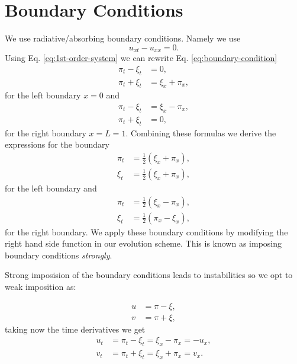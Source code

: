 \documentclass[reprint, prd, nofootinbib, superscriptaddress, floatfix]{revtex4-2}  %
\begin{document}
\section{Boundary Conditions}
We use radiative/absorbing boundary conditions. Namely we use
\begin{equation}
  \label{eq:boundary-condition}
  u_{xt} - u_{xx} = 0.
\end{equation}
Using Eq. \ref{eq:1st-order-system} we can rewrite Eq. \ref{eq:boundary-condition}
\begin{align}
  \label{eq:bc-left}
  \pi_t - \xi_t &= 0, \\
  \pi_t + \xi_t &= \xi_x + \pi_x,
\end{align}
for the left boundary $x=0$ and
\begin{align}
  \label{eq:bc-right}
  \pi_t - \xi_t &= \xi_x - \pi_x, \\
  \pi_t + \xi_t &= 0,
\end{align}
for the right boundary $x=L=1$. Combining these formulas we derive the expressions for the boundary
\begin{equation}
  \label{eq:rhs-bc-left}
  \begin{split}
    \pi_t &= \frac{1}{2} (\xi_x + \pi_x), \\
    \xi_t &= \frac{1}{2} (\xi_x + \pi_x),
  \end{split}
\end{equation}
for the left boundary and
\begin{equation}
  \label{eq:rhs-bc-right}
  \begin{split}
    \pi_t &= \frac{1}{2} (\xi_x - \pi_x), \\
    \xi_t &= \frac{1}{2} (\pi_x - \xi_x),
  \end{split}
\end{equation}
for the right boundary. We apply these boundary conditions by modifying the right hand side function in our evolution scheme. This is known as imposing boundary conditions \textit{strongly}.

Strong imposision of the boundary conditions leads to instabilities so we opt to weak imposition as:

\begin{align}
  u &= \pi - \xi,  \label{eq:characteristic_vars1} \\
  v &= \pi + \xi,   \label{eq:characteristic_vars2}
\end{align}
taking now the time derivatives we get
\begin{align}
  \label{eq:left_boundary_1}
  u_t &= \pi_t - \xi_t = \xi_x - \pi_x = -u_x, \\
  v_t &= \pi_t + \xi_t = \xi_x + \pi_x = v_x.
\end{align}
\end{document}
